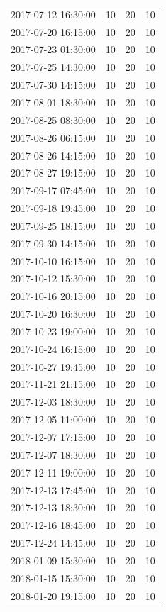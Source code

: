 \begin{tabular}{lrrr}
2017-07-12 16:30:00 & 10 & 20 & 10 \\
2017-07-20 16:15:00 & 10 & 20 & 10 \\
2017-07-23 01:30:00 & 10 & 20 & 10 \\
2017-07-25 14:30:00 & 10 & 20 & 10 \\
2017-07-30 14:15:00 & 10 & 20 & 10 \\
2017-08-01 18:30:00 & 10 & 20 & 10 \\
2017-08-25 08:30:00 & 10 & 20 & 10 \\
2017-08-26 06:15:00 & 10 & 20 & 10 \\
2017-08-26 14:15:00 & 10 & 20 & 10 \\
2017-08-27 19:15:00 & 10 & 20 & 10 \\
2017-09-17 07:45:00 & 10 & 20 & 10 \\
2017-09-18 19:45:00 & 10 & 20 & 10 \\
2017-09-25 18:15:00 & 10 & 20 & 10 \\
2017-09-30 14:15:00 & 10 & 20 & 10 \\
2017-10-10 16:15:00 & 10 & 20 & 10 \\
2017-10-12 15:30:00 & 10 & 20 & 10 \\
2017-10-16 20:15:00 & 10 & 20 & 10 \\
2017-10-20 16:30:00 & 10 & 20 & 10 \\
2017-10-23 19:00:00 & 10 & 20 & 10 \\
2017-10-24 16:15:00 & 10 & 20 & 10 \\
2017-10-27 19:45:00 & 10 & 20 & 10 \\
2017-11-21 21:15:00 & 10 & 20 & 10 \\
2017-12-03 18:30:00 & 10 & 20 & 10 \\
2017-12-05 11:00:00 & 10 & 20 & 10 \\
2017-12-07 17:15:00 & 10 & 20 & 10 \\
2017-12-07 18:30:00 & 10 & 20 & 10 \\
2017-12-11 19:00:00 & 10 & 20 & 10 \\
2017-12-13 17:45:00 & 10 & 20 & 10 \\
2017-12-13 18:30:00 & 10 & 20 & 10 \\
2017-12-16 18:45:00 & 10 & 20 & 10 \\
2017-12-24 14:45:00 & 10 & 20 & 10 \\
2018-01-09 15:30:00 & 10 & 20 & 10 \\
2018-01-15 15:30:00 & 10 & 20 & 10 \\
2018-01-20 19:15:00 & 10 & 20 & 10 \\

\end{tabular}
